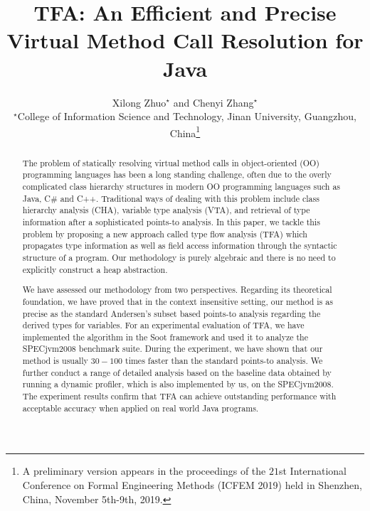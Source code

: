 \documentclass{fac}
\title{TFA: An Efficient and Precise Virtual Method Call Resolution for Java}
\author[Xilong Zhuo and Chenyi Zhang]
    {Xilong Zhuo$^\star$ and Chenyi Zhang$^\star$\\
     $^\star$College of Information Science and Technology, Jinan University, Guangzhou, China\thanks{A preliminary version appears in the proceedings of the $21$st International Conference on Formal Engineering Methods (ICFEM 2019) held in Shenzhen, China, November 5th-9th, 2019.}}
\begin{document}
\label{firstpage}

\makecorrespond

\maketitle

\begin{abstract}
The problem of statically resolving virtual method calls in object-oriented (OO) programming languages has been a long standing challenge, often due to the overly complicated class hierarchy structures in modern OO programming languages such as Java, C$\#$ and C++. Traditional ways of dealing with this problem include class hierarchy analysis (CHA), variable type analysis (VTA), and retrieval of type information after a sophisticated points-to analysis. In this paper, we tackle this problem by proposing a new approach called type flow analysis (TFA) which propagates type information as well as field access information through the syntactic structure of a program. Our methodology is purely algebraic and there is no need to explicitly construct a heap abstraction.

We have assessed our methodology from two perspectives. Regarding its theoretical foundation, we have proved that in the context insensitive setting, our method is as precise as the standard Andersen's subset based points-to analysis regarding the derived types for variables. For an experimental evaluation of TFA, we have implemented the algorithm in the Soot framework and used it to analyze the SPECjvm2008 benchmark suite. During the experiment, we have shown that our method is usually $30-100$ times faster than the standard points-to analysis. We further conduct a range of detailed analysis based on the baseline data obtained by running a dynamic profiler, which is also implemented by us, on the SPECjvm2008. The experiment results confirm that TFA can achieve outstanding performance with acceptable accuracy when applied on real world Java programs.


\end{abstract}
\end{document}
